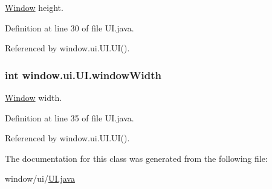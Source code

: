 \hyperlink{classwindow_1_1_window}{Window} height. 



Definition at line 30 of file U\-I.\-java.



Referenced by window.\-ui.\-U\-I.\-U\-I().

\hypertarget{classwindow_1_1ui_1_1_u_i_a4c35432cda424d024255606d4f95caf2}{
\subsubsection[{window\-Width}]{\setlength{\rightskip}{0pt plus 5cm}int window.\-ui.\-U\-I.\-window\-Width\hspace{0.3cm}{\ttfamily [protected]}}}\label{classwindow_1_1ui_1_1_u_i_a4c35432cda424d024255606d4f95caf2}


\hyperlink{classwindow_1_1_window}{Window} width. 



Definition at line 35 of file U\-I.\-java.



Referenced by window.\-ui.\-U\-I.\-U\-I().



The documentation for this class was generated from the following file\-:\begin{DoxyCompactItemize}
\item 
window/ui/\hyperlink{_u_i_8java}{U\-I.\-java}\end{DoxyCompactItemize}
